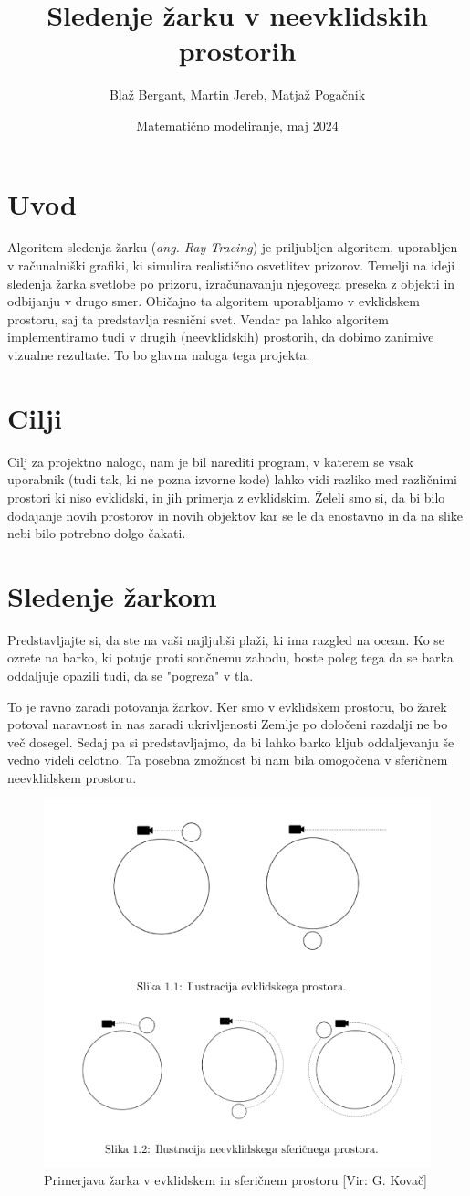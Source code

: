 \documentclass[titlepage]{article}
\title{Sledenje žarku v neevklidskih prostorih}
\author{Blaž Bergant, Martin Jereb, Matjaž Pogačnik}
\date{Matematično modeliranje, maj 2024}
\begin{document}
\maketitle
\newpage
\tableofcontents
\newpage

\section{Uvod}
Algoritem sledenja žarku (\textit{ang. Ray Tracing}) je priljubljen algoritem, uporabljen v 
računalniški grafiki, ki simulira realistično osvetlitev prizorov. Temelji na ideji sledenja 
žarka svetlobe po prizoru, izračunavanju njegovega preseka z objekti in odbijanju v drugo smer. 
Običajno ta algoritem uporabljamo v evklidskem prostoru, saj ta predstavlja resnični svet. 
Vendar pa lahko algoritem implementiramo tudi v drugih (neevklidskih) prostorih, da dobimo 
zanimive vizualne rezultate. To bo glavna naloga tega projekta.

\section{Cilji}
Cilj za projektno nalogo, nam je bil narediti program, v katerem se vsak uporabnik (tudi tak, ki 
ne pozna izvorne kode) lahko vidi razliko med različnimi prostori ki niso evklidski, in 
jih primerja z evklidskim. Želeli smo si, da bi bilo dodajanje novih prostorov in 
novih objektov kar se le da enostavno in da na slike nebi bilo potrebno dolgo čakati.


\section{Sledenje žarkom}
Predstavljajte si, da ste na vaši najljubši plaži, ki ima razgled na ocean. Ko se ozrete na barko,
ki potuje proti sončnemu zahodu, boste poleg tega da se barka oddaljuje opazili tudi, da se "pogreza" 
v tla.

To je ravno zaradi potovanja žarkov. Ker smo v evklidskem prostoru, bo žarek potoval naravnost in nas 
zaradi ukrivljenosti Zemlje po določeni razdalji ne bo več dosegel. Sedaj pa si predstavljajmo, 
da bi lahko barko kljub oddaljevanju še vedno videli celotno. Ta posebna zmožnost bi nam bila 
omogočena v sferičnem neevklidskem prostoru.

\begin{figure}[H]
    \centering
    \includegraphics[width=0.5\linewidth]{Images/potovanje_zarkov.png}
    \caption{Primerjava žarka v evklidskem in sferičnem prostoru [Vir: G. Kovač]}
    \label{Slika:Primerjava žarkov evklidski, sferični}
\end{figure}
\end{document}
